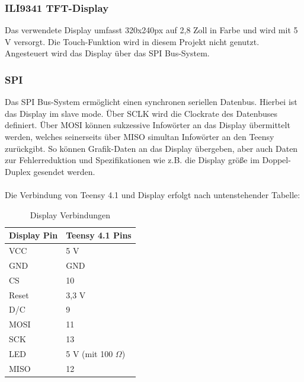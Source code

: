 \documentclass[12pt]{article}
\begin{document}
\subsubsection{ILI9341 TFT-Display}
Das verwendete Display umfasst 320x240px auf 2,8 Zoll in Farbe und wird mit 5 V versorgt.
Die Touch-Funktion wird in diesem Projekt nicht genutzt.
Angesteuert wird das Display über das SPI Bus-System.

\subsubsection{SPI}
Das SPI Bus-System ermöglicht einen synchronen seriellen Datenbus. Hierbei ist das Display im \glq slave mode\grq{}\:.
Über SCLK wird die Clockrate des Datenbuses definiert. Über \glq MOSI\grq{}\: können sukzessive Infowörter an das Display übermittelt werden, welches 
seinerseits über \glq MISO\grq{}\: simultan Infowörter an den Teensy zurückgibt. So können Grafik-Daten an das Display übergeben, aber auch Daten zur 
Fehlerreduktion und Spezifikationen wie z.B. die Display größe im Doppel-Duplex gesendet werden.
\\
\\
Die Verbindung von Teensy 4.1 und Display erfolgt nach untenstehender Tabelle:
\\
\begin{table}[h]
  \centering
  \caption{Display Verbindungen}
  \label{tbl:displayverbindungen}
  \begin{tabular}{l|l}
    \textbf{Display Pin}  & \textbf{Teensy 4.1 Pins}\\
    \hline
    VCC & 5 V\\
 
    GND	 & GND\\
 
    CS	 & 10\\

    Reset	 & 3,3 V\\

    D/C	 & 9\\

    MOSI	 & 11\\

    SCK	 & 13\\

    LED	 & 5 V (mit 100 $\Omega$)\\

    MISO	 & 12\\
   

  \end{tabular}    

\end{table}
\end{document}
